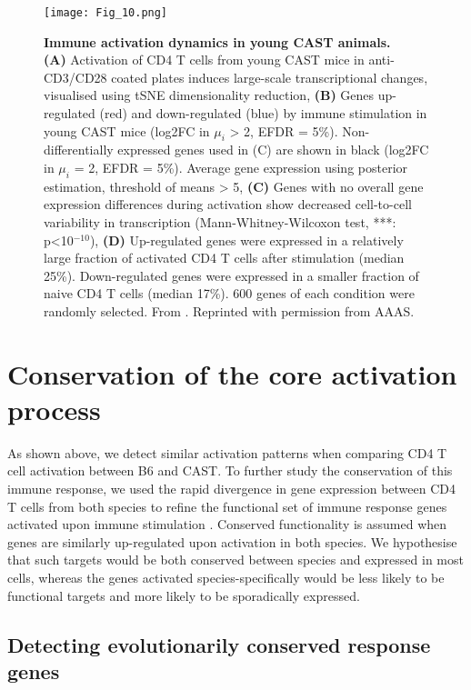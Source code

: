 \begin{figure}[!ht]
\centering
\texttt{[image: Fig\_10.png]}
\caption[Immune activation dynamics in young CAST animals]{\textbf{Immune activation dynamics in young CAST animals.}\\
\textbf{(A)} Activation of CD4\plus{} T cells from young CAST mice in anti-CD3\textepsilon{}/CD28 coated plates induces large-scale transcriptional changes, visualised using tSNE dimensionality reduction, 
\textbf{(B)} Genes up-regulated (red) and down-regulated (blue) by immune stimulation in young CAST mice (log2FC in $\mu_i$ > 2, EFDR = 5\%). Non-differentially expressed genes used in (C) are shown in black (log2FC in $\mu_i$ = 2, EFDR = 5\%). Average gene expression using posterior estimation, threshold of means > 5, 
\textbf{(C)} Genes with no overall gene expression differences during activation show decreased cell-to-cell variability in transcription (Mann-Whitney-Wilcoxon test, ***: p<10$^{-10}$), 
\textbf{(D)} Up-regulated genes were expressed in a relatively large fraction of activated CD4\plus{} T cells after stimulation (median 25\%). 
Down-regulated genes were expressed in a smaller fraction of naive CD4\plus{} T cells (median 17\%). 
600 genes of each condition were randomly selected. 
From \citep{Martinez-jimenez2017}. 
Reprinted with permission from AAAS.}
\label{fig1:immune_activation_CAST}
\end{figure}

\newpage

\section{Conservation of the core activation process}

As shown above, we detect similar activation patterns when comparing CD4\plus{} T cell activation between B6 and CAST. 
To further study the conservation of this immune response, we used the rapid divergence in gene expression between CD4\plus{} T cells from both species to refine the functional set of immune response genes activated upon immune stimulation \citep{Shay2013}. 
Conserved functionality is assumed when genes are similarly up-regulated upon activation in both species. 
We hypothesise that such targets would be both conserved between species and expressed in most cells, whereas the genes activated species-specifically would be less likely to be functional targets and more likely to be sporadically expressed.

\subsection{Detecting evolutionarily conserved response genes}

